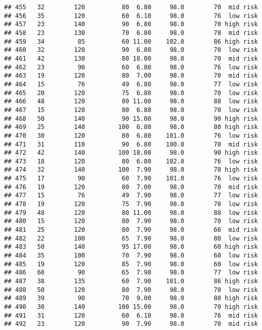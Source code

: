 \documentclass[
  ignorenonframetext,
]{beamer}
\begin{document}
\begin{frame}[fragile]
\begin{verbatim}
## 455   32        120          80  6.80     98.0        70  mid risk
## 456   35        120          60  6.10     98.0        76  low risk
## 457   23        140          90  6.80     98.0        70 high risk
## 458   23        130          70  6.80     98.0        78  mid risk
## 459   34         85          60 11.00    102.0        86 high risk
## 460   32        120          90  6.80     98.0        70  low risk
## 461   42        130          80 18.00     98.0        70  mid risk
## 462   23         90          60  6.80     98.0        76  low risk
## 463   19        120          80  7.00     98.0        70  mid risk
## 464   15         76          49  6.80     98.0        77  low risk
## 465   20        120          75  6.80     98.0        70  low risk
## 466   48        120          80 11.00     98.0        88  low risk
## 467   15        120          80  6.80     98.0        70  low risk
## 468   50        140          90 15.00     98.0        90 high risk
## 469   25        140         100  6.80     98.0        80 high risk
## 470   30        120          80  6.80    101.0        76  low risk
## 471   31        110          90  6.80    100.0        70  mid risk
## 472   42        140         100 18.00     98.0        90 high risk
## 473   18        120          80  6.80    102.0        76  low risk
## 474   32        140         100  7.90     98.0        78 high risk
## 475   17         90          60  7.90    101.0        76  low risk
## 476   19        120          80  7.00     98.0        70  mid risk
## 477   15         76          49  7.90     98.0        77  low risk
## 478   19        120          75  7.90     98.0        70  low risk
## 479   48        120          80 11.00     98.0        88  low risk
## 480   15        120          80  7.90     98.0        70  low risk
## 481   25        120          80  7.90     98.0        66  mid risk
## 482   22        100          65  7.90     98.0        80  low risk
## 483   50        140          95 17.00     98.0        60 high risk
## 484   35        100          70  7.90     98.0        60  low risk
## 485   19        120          85  7.90     98.0        60  low risk
## 486   60         90          65  7.90     98.0        77  low risk
## 487   38        135          60  7.90    101.0        86 high risk
## 488   50        120          80  7.90     98.0        70  low risk
## 489   39         90          70  9.00     98.0        80 high risk
## 490   30        140         100 15.00     98.0        70 high risk
## 491   31        120          60  6.10     98.0        76  mid risk
## 492   23        120          90  7.90     98.0        70  mid risk

\end{verbatim}
\end{frame}
\end{document}
